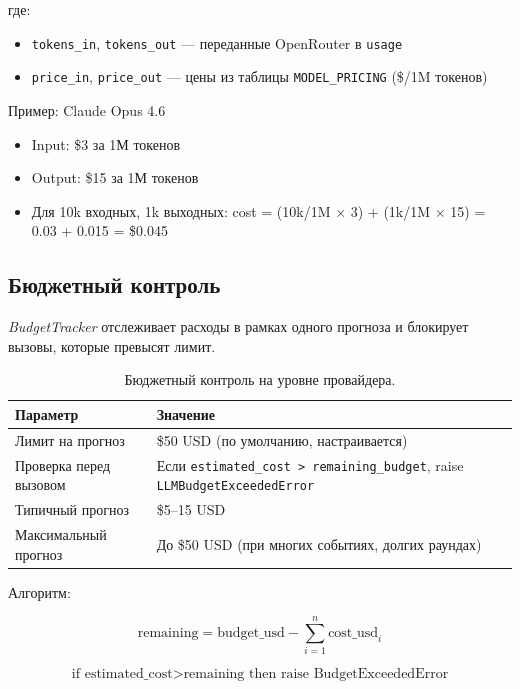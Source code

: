 где:
\begin{itemize}[nosep]
\item \texttt{tokens\_in}, \texttt{tokens\_out} — переданные OpenRouter в \texttt{usage}
\item \texttt{price\_in}, \texttt{price\_out} --- цены из таблицы \texttt{MODEL\_PRICING} (\$/1M токенов)
\end{itemize}

Пример: Claude Opus 4.6
\begin{itemize}[nosep]
\item Input: \$3 за 1М токенов
\item Output: \$15 за 1М токенов
\item Для 10k входных, 1k выходных: cost = (10k/1M $\times$ 3) + (1k/1M $\times$ 15) = 0.03 + 0.015 = \$0.045
\end{itemize}

\subsection{Бюджетный контроль}


\emph{BudgetTracker} отслеживает расходы в рамках одного прогноза и блокирует вызовы, которые превысят лимит.

\begin{table}[h]
\centering
\begin{tabular}{|l|l|}
\hline
\textbf{Параметр} & \textbf{Значение} \\
\hline
Лимит на прогноз & \$50 USD (по умолчанию, настраивается) \\
Проверка перед вызовом & Если \texttt{estimated\_cost > remaining\_budget}, raise \texttt{LLMBudgetExceededError} \\
Типичный прогноз & \$5–15 USD \\
Максимальный прогноз & До \$50 USD (при многих событиях, долгих раундах) \\
\hline
\end{tabular}
\caption{Бюджетный контроль на уровне провайдера.}
\label{tab:budget}
\end{table}

Алгоритм:

\begin{equation}
\text{remaining} = \text{budget\_usd} - \sum_{i=1}^{n} \text{cost\_usd}_i
\end{equation}

\begin{equation}
\text{if } \text{estimated\_cost} > \text{remaining} \text{ then } \text{raise BudgetExceededError}
\end{equation}

